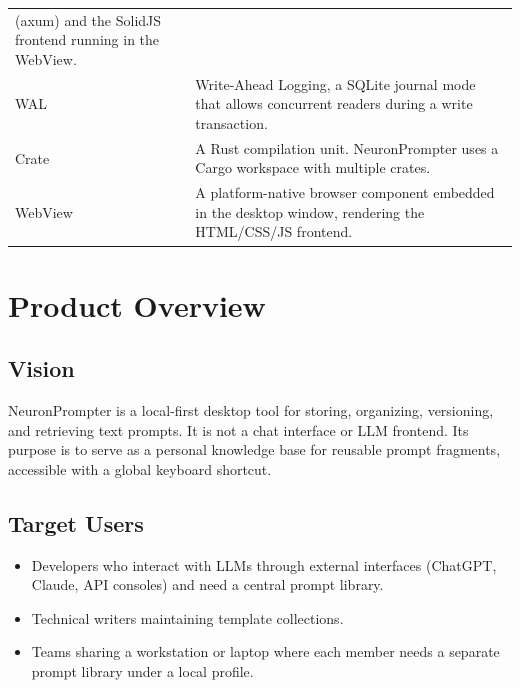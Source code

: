 \documentclass[a4paper, 11pt, oneside]{report}
\begin{document}
\begin{table}[H]
\begin{tabularx}{\textwidth}{l X}
                    (axum) and the SolidJS frontend
                    running in the WebView. \\
    WAL           & Write-Ahead Logging, a SQLite journal mode that allows
                    concurrent readers during a write transaction. \\
    Crate         & A Rust compilation unit.  NeuronPrompter uses a Cargo
                    workspace with multiple crates. \\
    WebView       & A platform-native browser component embedded in the
                    desktop window, rendering the HTML/CSS/JS frontend. \\
    \bottomrule
  \end{tabularx}
\end{table}


\chapter{Product Overview}
\label{ch:product}

\section{Vision}
\label{sec:vision}

NeuronPrompter is a local-first desktop tool for storing, organizing,
versioning, and retrieving text prompts.  It is not a chat interface or LLM
frontend.  Its purpose is to serve as a personal knowledge base for
reusable prompt fragments, accessible with a global keyboard shortcut.

\section{Target Users}
\label{sec:target-users}

\begin{itemize}
  \item Developers who interact with LLMs through external interfaces
        (ChatGPT, Claude, API consoles) and need a central prompt library.
  \item Technical writers maintaining template collections.
  \item Teams sharing a workstation or laptop where each member needs a
        separate prompt library under a local profile.
\end{itemize}
\end{document}
